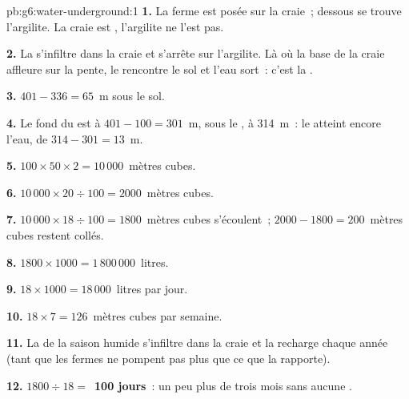\begin{solution}{pb:g6:water-underground:1}
\textbf{1.} La ferme est posée sur la craie~; dessous se trouve
l'argilite. La craie est , l'argilite ne l'est pas.

\textbf{2.} La  s'infiltre dans la craie et s'arrête sur l'argilite.
Là où la base de la craie affleure sur la pente, le 
rencontre le sol et l'eau sort~: c'est la .

\textbf{3.} $401 - 336 = 65$~m sous le sol.

\textbf{4.} Le fond du  est à $401 - 100 = 301$~m, sous le , à 314~m~: le  atteint encore l'eau, de $314 - 301 =
13$~m.

\textbf{5.} $100 \times 50 \times 2 = 10\,000$~mètres cubes.

\textbf{6.} $10\,000 \times 20 \div 100 = 2000$~mètres cubes.

\textbf{7.} $10\,000 \times 18 \div 100 = 1800$~mètres cubes s'écoulent~;
$2000 - 1800 = 200$~mètres cubes restent collés.

\textbf{8.} $1800 \times 1000 = 1\,800\,000$~litres.

\textbf{9.} $18 \times 1000 = 18\,000$~litres par jour.

\textbf{10.} $18 \times 7 = 126$~mètres cubes par semaine.

\textbf{11.} La  de la saison humide s'infiltre dans la craie et la
recharge chaque année (tant que les fermes ne pompent pas plus que ce que
la  rapporte).

\textbf{12.} $1800 \div 18 = $~\textbf{100 jours}~: un peu plus de trois
mois sans aucune .
\end{solution}
